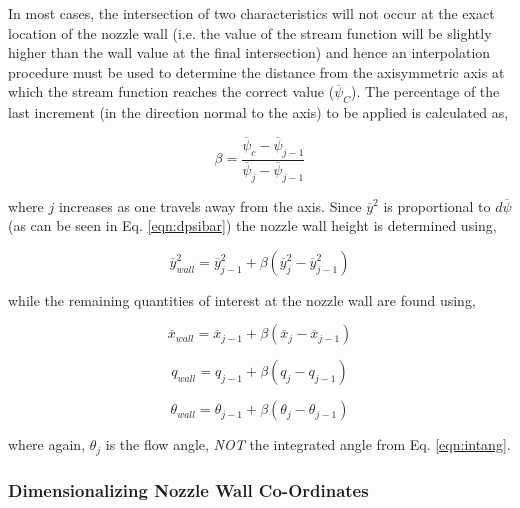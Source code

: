 	In most cases, the intersection of two characteristics will not occur at the exact location
of the nozzle wall (i.e. the value of the stream function will be slightly higher than the wall value
at the final intersection) and hence an interpolation procedure must be used to determine the 
distance from the axisymmetric axis at which the stream function reaches the correct value ($\overline{\psi}_C$).  
The percentage of the last increment (in the direction normal to the axis) to be applied is calculated as,

\begin{equation}
	\beta=\frac{\overline{\psi}_c - \overline{\psi}_{j-1}}{\overline{\psi}_j - \overline{\psi}_{j-1}}
\label{eqn:percent}
\end{equation}

	where $j$ increases as one travels away from the axis.  Since $\overline{y}^2$ is proportional to 
$d\overline{\psi}$
(as can be seen in Eq. \ref{eqn:dpsibar}) the nozzle wall height is determined using,

\begin{equation}
	\overline{y}_{wall}^2 = \overline{y}_{j-1}^2 + \beta(\overline{y}_j^2 - \overline{y}_{j-1}^2)
\label{eqn:ywall}
\end{equation}

	while the remaining quantities of interest at the nozzle wall are found using,

\begin{displaymath}
	\overline{x}_{wall}=\overline{x}_{j-1} + \beta(\overline{x}_j-\overline{x}_{j-1})
\end{displaymath}

\begin{displaymath}
	q_{wall}=q_{j-1} + \beta(q_j-q_{j-1})
\end{displaymath}

\begin{displaymath}
	\theta_{wall}=\theta_{j-1} + \beta(\theta_j-\theta_{j-1})
\end{displaymath}
	
	where again, $\theta_j$ is the flow angle, \emph{NOT} the integrated angle from Eq. \ref{eqn:intang}.

\subsubsection{Dimensionalizing Nozzle Wall Co-Ordinates}

